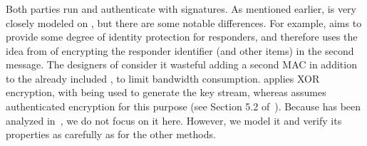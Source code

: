 \subsubsection{\mSigSig{}}
Both parties run \mSig{} and authenticate with signatures.
%
As mentioned earlier, \mSigSig{} is very closely modeled on \mSigmaI{}, but
there are some notable differences.
%
For example, \mEdhoc{} aims to provide some degree of identity protection for
responders, and therefore uses the idea from \mSigmaI{} of encrypting the
responder identifier \mIdcredr{} (and other items) in the second message.
%
The designers of \mEdhoc{} consider it wasteful adding a second MAC in addition
to the already included \mMactwo{}, to limit bandwidth consumption.
%
\mEdhoc{} applies XOR encryption, with \mHkdf{} being used to generate the
key stream, whereas \mSigma{} assumes authenticated encryption for this
purpose (see Section 5.2 of~\cite{sigma}).
%
Because \mSigSig{} has been analyzed in~\cite{DBLP:conf/secsr/BruniJPS18}, we
do not focus on it here.
%
However, we model it and verify its properties as carefully as for the other methods.



%
%

